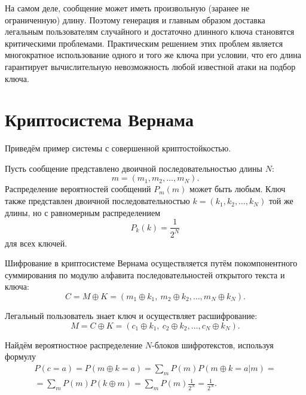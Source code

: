 
На самом деле, сообщение может иметь произвольную (заранее не ограниченную) длину. Поэтому генерация и главным образом доставка легальным пользователям случайного и достаточно длинного ключа становятся критическими проблемами. Практическим решением этих проблем является многократное использование одного и того же ключа при условии, что его длина гарантирует вычислительную невозможность любой известной атаки на подбор ключа.


\section{Криптосистема Вернама}

Приведём пример системы с совершенной криптостойкостью.

Пусть сообщение представлено двоичной последовательностью длины $N$:
    \[ m = (m_1, m_2, \dots, m_N). \]
Распределение вероятностей сообщений $P_m(m)$ может быть любым. Ключ также представлен двоичной последовательностью $ k = (k_1, k_2, \dots, k_N)$ той же длины, но с равномерным распределением
    \[ P_k(k) = \frac{1}{2^N} \]
для всех ключей.

Шифрование в криптосистеме Вернама осуществляется путём покомпонентного суммирования по модулю алфавита последовательностей открытого текста и ключа:
    \[ C = M \oplus K = (m_1 \oplus k_1, ~ m_2 \oplus k_2, \dots, m_N \oplus k_N). \]

Легальный пользователь знает ключ и осуществляет расшифрование:
    \[ M =C \oplus K = (c_1 \oplus k_1, ~ c_2 \oplus k_2, \dots, c_N \oplus k_N). \]

Найдём вероятностное распределение $N$-блоков шифротекстов, используя формулу
\begin{multline*}
P(c = a) = P(m \oplus k = a) = \sum_{m} P(m) P(m \oplus k = a | m) = \\
= \sum_{m} P(m) P(k \oplus m) = \sum_{m} P(m) \frac{1}{2^N} = \frac{1}{2^N}. 
\end{multline*}


